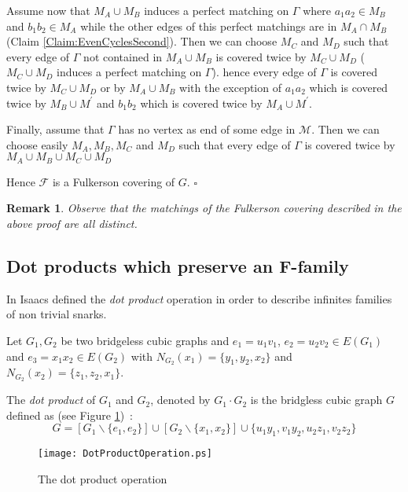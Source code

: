 \documentclass{amsart}
\newtheorem{rem}[thm]{Remark}
\theoremstyle{definition}
\theoremstyle{remark}
\newenvironment{prf}{{\bf \noindent Proof } }{\hfill$\square$\\}
\begin{document}
\begin{prf}
Assume now that  $M_{A} \cup M_{B}$ induces a perfect matching on
$\Gamma$ where $a_{1}a_{2} \in M_{B}$ and $b_{1}b_{2} \in M_{A}$
while the other edges of this perfect matchings are in $M_{A} \cap
M_{B}$ (Claim \ref{Claim:EvenCyclesSecond}). Then we can choose
$M_{C}$ and $M_{D}$ such that every edge of $\Gamma$ not contained
in $M_{A} \cup M_{B}$ is covered twice by $M_{C} \cup M_{D}$ ($M_{C}
\cup M_{D}$ induces a perfect matching on $\Gamma$). hence every
edge of $\Gamma$ is covered twice by $M_{C} \cup M_{D}$ or by $M_{A}
\cup M_{B}$ with the exception of $a_{1}a_{2}$ which is covered
twice by $M_{B} \cup M^{'}$ and $b_{1}b_{2}$ which is covered twice
by $M_{A} \cup M^{'}$.


Finally, assume that $\Gamma$ has no vertex as end of some edge in
$\mathcal M$. Then we can choose easily $M_{A}, M_{B}, M_{C}$ and
$M_{D}$ such that every edge of $\Gamma$ is covered twice by
$M_{A}\cup M_{B}\cup M_{C}\cup M_{D}$

Hence $\mathcal F$ is a Fulkerson covering of $G$.
\end{prf}
\begin{rem} \label{Rem:TousDistincts}
Observe that the matchings of the Fulkerson covering described in the above
proof are all distinct.
\end{rem}
\subsection{Dot products which preserve an F-family}
In \cite{Isa75} Isaacs defined the {\em dot product} operation in order to
describe infinites families of non trivial snarks.

Let $G_{1}, G_{2}$ be two bridgeless cubic graphs and
$e_{1}=u_{1}v_{1}$, $e_{2}=u_{2}v_{2} \in E(G_{1})$ and
$e_{3}=x_{1}x_{2} \in E(G_{2})$ with
$N_{G_{2}}(x_{1})=\{y_{1},y_{2},x_{2}\}$ and
$N_{G_{2}}(x_{2})=\{z_{1},z_{2},x_{1}\}$.

The {\em dot product} of  $G_1$ and $G_2$, denoted by $G_1 \cdot
G_2$
is the bridgless cubic graph $G$ defined
as  (see Figure \ref{Fig:DotProduct})~:
$$G=[G_{1} \backslash \{e_{1},e_{2}\}] \cup [G_{2} \backslash
\{x_{1},x_{2}\}] \cup
\{u_{1}y_{1},v_{1}y_{2},u_{2}z_{1},v_{2}z_{2}\}$$

\begin{figure}
\begin{center}
\texttt{[image: DotProductOperation.ps]}
\end{center}
\caption{The dot product operation\label{Fig:DotProduct}} 
\end{figure}
\end{document}
